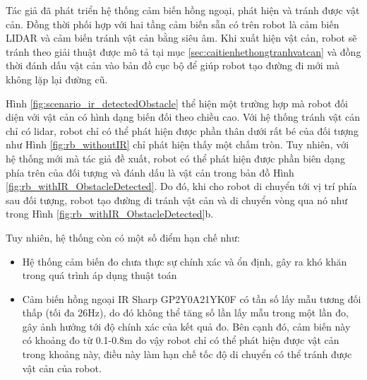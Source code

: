 {Tác giả đã phát triển hệ thống cảm biến hồng ngoại, phát hiện và tránh được vật cản. Đồng thời phối hợp với hai tầng cảm biến sẵn có trên robot là cảm biến LIDAR và cảm biến tránh vật cản bằng siêu âm. Khi xuất hiện vật cản, robot sẽ tránh theo giải thuật được mô tả tại mục \ref{sec:caitienhethongtranhvatcan} và đồng thời đánh dấu vật cản vào bản đồ cục bộ để giúp robot tạo đường đi mới mà không lặp lại đường cũ.

Hình \ref{fig:scenario_ir_detectedObstacle} thể hiện một trường hợp mà robot đối diện với vật cản có hình dạng biến đối theo chiều cao. Với hệ thống tránh vật cản chỉ có lidar, robot chỉ có thể phát hiện được phần thân dưới rất bé của đối tượng như Hình \ref{fig:rb_withoutIR} chỉ phát hiện thấy một chấm tròn. Tuy nhiên, với hệ thống mới mà tác giả đề xuất, robot có thể phát hiện được phần biên dạng phía trên của đối tượng và đánh dấu là vật cản trong bản đồ Hình \ref{fig:rb_withIR_ObstacleDetected}. Do đó, khi cho robot di chuyển tới vị trí phía sau đối tượng, robot tạo đường đi tránh vật cản và di chuyển vòng qua nó như trong Hình \ref{fig:rb_withIR_ObstacleDetected}b.

Tuy nhiên, hệ thống còn có một số điểm hạn chế như:
\begin{itemize}
    \item Hệ thống cảm biến đo chưa thực sự chính xác và ổn định, gây ra khó khăn trong quá trình áp dụng thuật toán
    \item Cảm biến hồng ngoại IR Sharp GP2Y0A21YK0F có tần số lấy mẫu tương đối thấp (tối đa 26Hz), do đó không thể tăng số lần lấy mẫu trong một lần đo, gây ảnh hưởng tới độ chính xác của kết quả đo. Bên cạnh đó, cảm biến này có khoảng đo từ 0.1-0.8m do vậy robot chỉ có thể phát hiện được vật cản trong khoảng này, điều này làm hạn chế tốc độ di chuyển có thể tránh được vật cản của robot.
\end{itemize}



}
